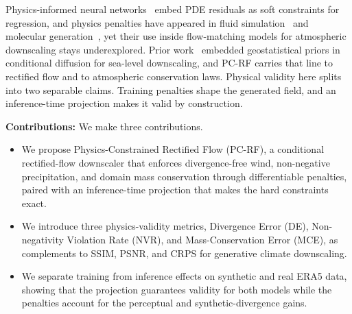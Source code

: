 \documentclass[letterpaper,withtimes]{easychair}
\newcommand{\pcrf}{\textsc{PC-RF}\xspace}
\begin{document}
Physics-informed neural networks~\citep{raissi2019physics} embed PDE residuals as soft constraints for regression, and physics penalties have appeared in fluid simulation~\citep{kochkov2021machine} and molecular generation~\citep{kohler2020equivariant}, yet their use inside flow-matching models for atmospheric downscaling stays underexplored. Prior work~\citep{sharma2024kriging} embedded geostatistical priors in conditional diffusion for sea-level downscaling, and \pcrf carries that line to rectified flow and to atmospheric conservation laws. Physical validity here splits into two separable claims. Training penalties shape the generated field, and an inference-time projection makes it valid by construction.

\noindent\textbf{Contributions:} We make three contributions.
\begin{itemize}[noitemsep,topsep=0pt]
\item We propose Physics-Constrained Rectified Flow (\pcrf), a conditional rectified-flow downscaler that enforces divergence-free wind, non-negative precipitation, and domain mass conservation through differentiable penalties, paired with an inference-time projection that makes the hard constraints exact.
\item We introduce three physics-validity metrics, Divergence Error (DE), Non-negativity Violation Rate (NVR), and Mass-Conservation Error (MCE), as complements to SSIM, PSNR, and CRPS for generative climate downscaling.
\item We separate training from inference effects on synthetic and real ERA5 data, showing that the projection guarantees validity for both models while the penalties account for the perceptual and synthetic-divergence gains.
\end{itemize}
\end{document}
